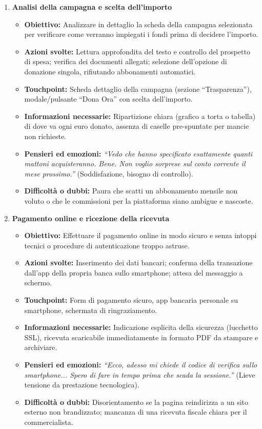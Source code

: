 \documentclass[11pt,a4paper]{article}
\begin{document}
\begin{enumerate}
        \item \textbf{Analisi della campagna e scelta dell'importo}
        \begin{itemize}
            \item \textbf{Obiettivo:} Analizzare in dettaglio la scheda della campagna selezionata per verificare come verranno impiegati i fondi prima di decidere l'importo.
            \item \textbf{Azioni svolte:} Lettura approfondita del testo e controllo del prospetto di spesa; verifica dei documenti allegati; selezione dell'opzione di donazione singola, rifiutando abbonamenti automatici.
            \item \textbf{Touchpoint:} Scheda dettaglio della campagna (sezione ``Trasparenza''), modale/pulsante ``Dona Ora'' con scelta dell'importo.
            \item \textbf{Informazioni necessarie:} Ripartizione chiara (grafico a torta o tabella) di dove va ogni euro donato, assenza di caselle pre-spuntate per mancie non richieste.
            \item \textbf{Pensieri ed emozioni:} \textit{``Vedo che hanno specificato esattamente quanti mattoni acquisteranno. Bene. Non voglio sorprese sul conto corrente il mese prossimo.''} (Soddisfazione, bisogno di controllo).
            \item \textbf{Difficoltà o dubbi:} Paura che scatti un abbonamento mensile non voluto o che le commissioni per la piattaforma siano ambigue e nascoste.
        \end{itemize}

        \item \textbf{Pagamento online e ricezione della ricevuta}
        \begin{itemize}
            \item \textbf{Obiettivo:} Effettuare il pagamento online in modo sicuro e senza intoppi tecnici o procedure di autenticazione troppo astruse.
            \item \textbf{Azioni svolte:} Inserimento dei dati bancari; conferma della transazione dall'app della propria banca sullo smartphone; attesa del messaggio a schermo.
            \item \textbf{Touchpoint:} Form di pagamento sicuro, app bancaria personale su smartphone, schermata di ringraziamento.
            \item \textbf{Informazioni necessarie:} Indicazione esplicita della sicurezza (lucchetto SSL), ricevuta scaricabile immediatamente in formato PDF da stampare e archiviare.
            \item \textbf{Pensieri ed emozioni:} \textit{``Ecco, adesso mi chiede il codice di verifica sullo smartphone... Spero di fare in tempo prima che scada la sessione.''} (Lieve tensione da prestazione tecnologica).
            \item \textbf{Difficoltà o dubbi:} Disorientamento se la pagina reindirizza a un sito esterno non brandizzato; mancanza di una ricevuta fiscale chiara per il commercialista.
        \end{itemize}


\end{enumerate}
\end{document}
